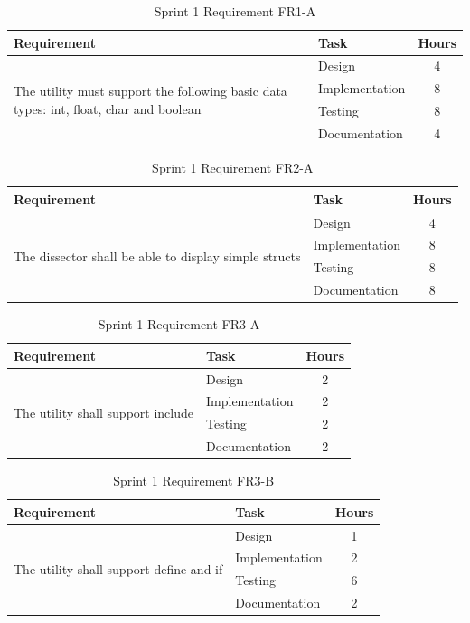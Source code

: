 \begin{table}[!ht] \small \center
\caption{Sprint 1 Requirement FR1-A\label{tab:sp1_req1a}}
\begin{tabular}{l l c}
	\toprule
	Requirement & Task & Hours \\
	\midrule
	\multirow{4}{5cm}{The \gls{utility} must support the following basic data types: \gls{int}, \gls{float}, \gls{char} and \gls{boolean}} & Design & 4 \\
	& Implementation & 8 \\
	& Testing & 8 \\
	& Documentation & 4 \\
	\bottomrule
\end{tabular}
\end{table}

\begin{table}[!ht] \small \center
\caption{Sprint 1 Requirement FR2-A\label{tab:sp1_req2a}}
\begin{tabular}{l l c}
	\toprule
	Requirement & Task & Hours \\
	\midrule
	\multirow{4}{5cm}{The \gls{dissector} shall be able to display simple \glspl{struct}} & Design & 4 \\
	& Implementation & 8 \\
	& Testing & 8 \\
	& Documentation & 8 \\
	\bottomrule
\end{tabular}
\end{table}

\begin{table}[!ht] \small \center
\caption{Sprint 1 Requirement FR3-A\label{tab:sp1_req3a}}
\begin{tabular}{l l c}
	\toprule
	Requirement & Task & Hours \\
	\midrule
	\multirow{4}{5cm}{The \gls{utility} shall support \gls{include}} & Design & 2 \\
	& Implementation & 2 \\
	& Testing & 2 \\
	& Documentation & 2 \\
	\bottomrule
\end{tabular}
\end{table}

\begin{table}[!ht] \small \center
\caption{Sprint 1 Requirement FR3-B\label{tab:sp1_req3b}}
\begin{tabular}{l l c}
	\toprule
	Requirement & Task & Hours \\
	\midrule
	\multirow{4}{5cm}{The \gls{utility} shall support \gls{define} and \gls{if}} & Design & 1 \\
	& Implementation & 2 \\
	& Testing & 6 \\
	& Documentation & 2 \\
	\bottomrule
\end{tabular}
\end{table}

